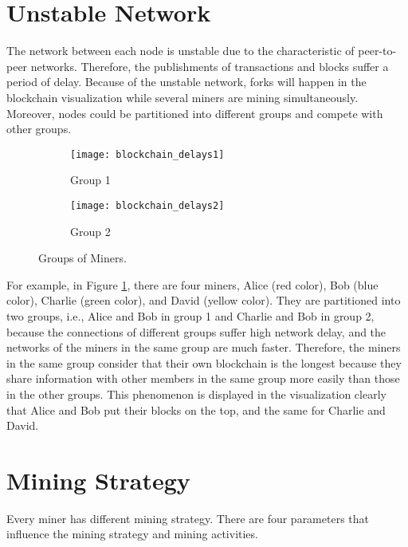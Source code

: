 \section{Unstable Network}

The network between each node is unstable due to the characteristic of peer-to-peer networks. Therefore, the publishments of transactions and blocks suffer a period of delay. Because of the unstable network, forks will happen in the blockchain visualization while several miners are mining simultaneously. Moreover, nodes could be partitioned into different groups and compete with other groups.

\begin{figure}[htb]
    \centering
    \begin{subfigure}[b]{1\textwidth}
        \centering
        \texttt{[image: blockchain\_delays1]}
        \caption{Group 1}
    \end{subfigure}
    
    \begin{subfigure}[b]{1\textwidth}
        \centering
        \texttt{[image: blockchain\_delays2]}
        \caption{Group 2}
    \end{subfigure}

    \caption{Groups of Miners.}
    \label{fig:groups of miners}
\end{figure}

For example, in Figure \ref{fig:groups of miners}, there are four miners, Alice (red color), Bob (blue color), Charlie (green color), and David (yellow color). They are partitioned into two groups, i.e., Alice and Bob in group 1 and Charlie and Bob in group 2, because the connections of different groups suffer high network delay, and the networks of the miners in the same group are much faster. Therefore, the miners in the same group consider that their own blockchain is the longest because they share information with other members in the same group more easily than those in the other groups. This phenomenon is displayed in the visualization clearly that Alice and Bob put their blocks on the top, and the same for Charlie and David.

\clearpage

\section{Mining Strategy}

Every miner has different mining strategy. There are four parameters that influence the mining strategy and mining activities. 

